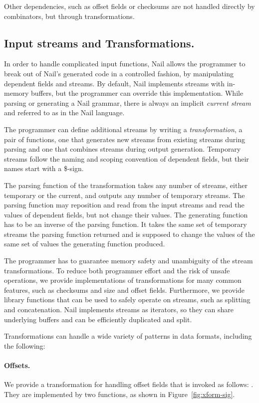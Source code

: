 Other dependencies, such as offset fields or checksums are not handled directly by combinators, but
through  transformations.

\subsection{Input streams and Transformations.}
\label{s:transforms}
In order to handle complicated input functions, Nail allows the programmer to
break out of Nail's generated code in a controlled fashion, by manipulating dependent fields and
streams. 
By default, Nail implements streams with in-memory buffers, but the programmer can override this implementation.
While parsing or generating a Nail grammar, there is always an implicit \emph{current stream} and
referred to as  in the Nail language.

The programmer can define additional streams by writing a \emph{transformation}, a pair of
functions, one that generates new streams from existing streams during parsing and one that
combines streams during output generation. Temporary streams follow the naming and
scoping convention of dependent fields, but their names start with a \$-sign. 


The parsing function of the transformation takes any number of streams, either temporary or the current,
and outputs any number of temporary streams. The parsing function may reposition and read from the
input streams and read the values of dependent fields, but not change their values. The generating
function has to be an inverse of the parsing function. It takes the same set of temporary streams
the parsing function returned and is supposed to change the values of the same set of values the
generating function produced.

The programmer has to guarantee memory safety and unambiguity of the stream transformations. To
reduce both programmer effort and the risk of unsafe operations, we provide implementations of
transformations for many common features, such as checksums and size and offset fields. Furthermore,
we provide library functions that can be used to safely operate on streams, such as splitting and
concatenation. Nail implements streams as iterators, so they can share underlying buffers and can be
efficiently duplicated and split.

Transformations can handle a wide variety of patterns in data formats, including the following: 
\paragraph{Offsets.}
We provide a transformation for handling offset fields that is invoked as follows:
. 
They are implemented by two functions, as shown in Figure~\ref{fig:xform-sig}.

